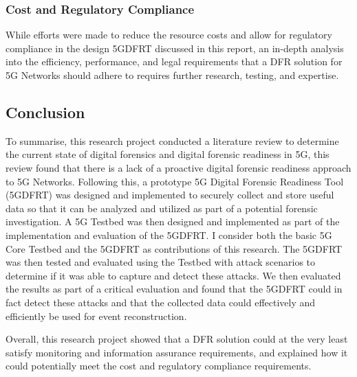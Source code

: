 \documentclass[final,1p,times,authoryear]{elsarticle}
\begin{document}
\subsubsection{Cost and Regulatory Compliance}
\label{sub6sub2sec3}
While efforts were made to reduce the resource costs and allow for regulatory compliance in the design 5GDFRT discussed in this report, an in-depth analysis into the efficiency, performance, and legal requirements that a DFR solution for 5G Networks should adhere to requires further research, testing, and expertise.

\subsection{Conclusion}
\label{sub6sec3}
To summarise, this research project conducted a literature review to determine the current state of digital forensics and digital forensic readiness in 5G, this review found that there is a lack of a proactive digital forensic readiness approach to 5G Networks. Following this, a prototype 5G Digital Forensic Readiness Tool (5GDFRT) was designed and implemented to securely collect and store useful data so that it can be analyzed and utilized as part of a potential forensic investigation. A 5G Testbed was then designed and implemented as part of the implementation and evaluation of the 5GDFRT. I consider both the basic 5G Core Testbed and the 5GDFRT as contributions of this research. The 5GDFRT was then tested and evaluated using the Testbed with attack scenarios to determine if it was able to capture and detect these attacks. We then evaluated the results as part of a critical evaluation and found that the 5GDFRT could in fact detect these attacks and that the collected data could effectively and efficiently be used for event reconstruction.

\vspace{1em}

Overall, this research project showed that a DFR solution could at the very least satisfy monitoring and information assurance requirements, and explained how it could potentially meet the cost and regulatory compliance requirements.

\newpage


\end{document}
